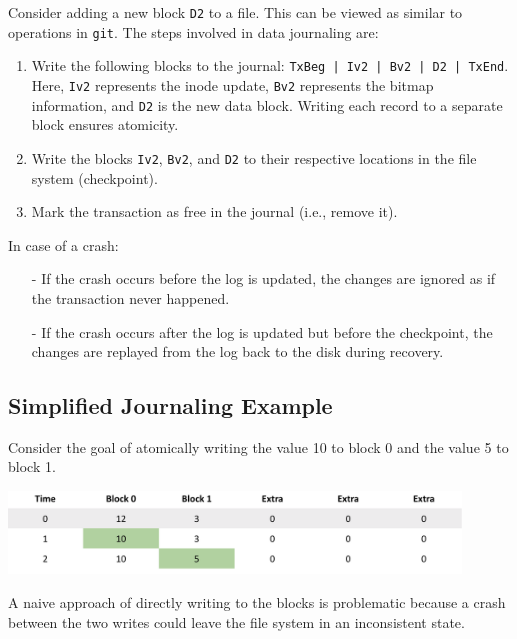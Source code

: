 \documentclass[../../compsys.tex]{subfiles}
\begin{document}
Consider adding a new block \texttt{D2} to a file. This can be viewed as similar to operations in \texttt{git}. The steps involved in data journaling are:

\begin{enumerate}
    \item Write the following blocks to the journal: \texttt{TxBeg | Iv2 | Bv2 | D2 | TxEnd}. Here, \texttt{Iv2} represents the inode update, \texttt{Bv2} represents the bitmap information, and \texttt{D2} is the new data block. Writing each record to a separate block ensures atomicity.
    \item Write the blocks \texttt{Iv2}, \texttt{Bv2}, and \texttt{D2} to their respective locations in the file system (checkpoint).
    \item Mark the transaction as free in the journal (i.e., remove it).
\end{enumerate}

In case of a crash:

\begin{itemize}
    \item [-] If the crash occurs before the log is updated, the changes are ignored as if the transaction never happened.
    \item [-] If the crash occurs after the log is updated but before the checkpoint, the changes are replayed from the log back to the disk during recovery.
\end{itemize}

\subsection{Simplified Journaling Example}

Consider the goal of atomically writing the value 10 to block 0 and the value 5 to block 1.

\begin{center}
    \includegraphics[width=0.9\textwidth]{chapters/L7/images/journal-example.png}
\end{center}

A naive approach of directly writing to the blocks is problematic because a crash between the two writes could leave the file system in an inconsistent state.
\end{document}
